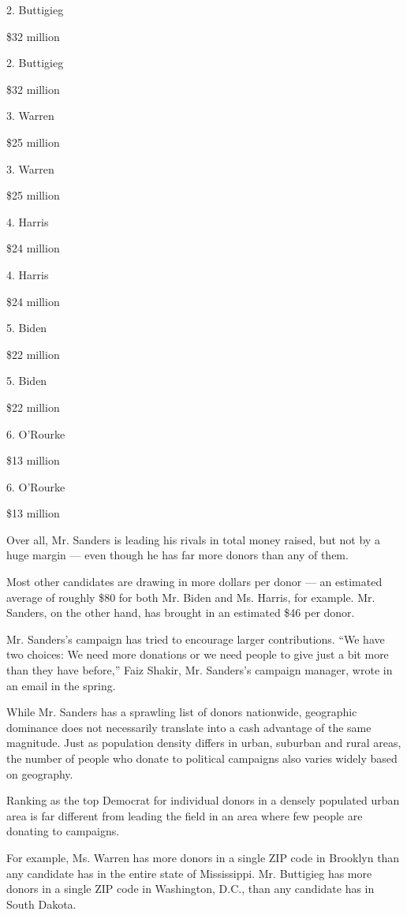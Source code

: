 2. Buttigieg

\$32 million

2. Buttigieg

\$32 million

3. Warren

\$25 million

3. Warren

\$25 million

4. Harris

\$24 million

4. Harris

\$24 million

5. Biden

\$22 million

5. Biden

\$22 million

6. O'Rourke

\$13 million

6. O'Rourke

\$13 million

Over all, Mr. Sanders is leading his rivals in total money raised, but
not by a huge margin --- even though he has far more donors than any of
them.

Most other candidates are drawing in more dollars per donor --- an
estimated average of roughly \$80 for both Mr. Biden and Ms. Harris, for
example. Mr. Sanders, on the other hand, has brought in an estimated
\$46 per donor.

Mr. Sanders's campaign has tried to encourage larger contributions. ``We
have two choices: We need more donations or we need people to give just
a bit more than they have before,'' Faiz Shakir, Mr. Sanders's campaign
manager, wrote in an email in the spring.

While Mr. Sanders has a sprawling list of donors nationwide, geographic
dominance does not necessarily translate into a cash advantage of the
same magnitude. Just as population density differs in urban, suburban
and rural areas, the number of people who donate to political campaigns
also varies widely based on geography.

Ranking as the top Democrat for individual donors in a densely populated
urban area is far different from leading the field in an area where few
people are donating to campaigns.

For example, Ms. Warren has more donors in a single ZIP code in Brooklyn
than any candidate has in the entire state of Mississippi. Mr. Buttigieg
has more donors in a single ZIP code in Washington, D.C., than any
candidate has in South Dakota.

